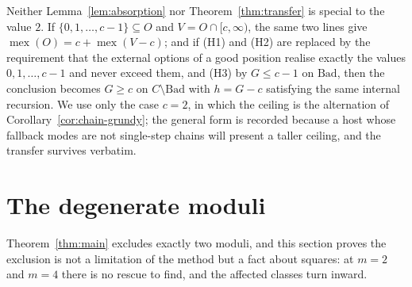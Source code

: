 \begin{remark}\label{rem:taller-ceiling}
Neither Lemma~\ref{lem:absorption} nor Theorem~\ref{thm:transfer} is
special to the value $2$. If $\{0, 1, \dots, c-1\} \subseteq O$ and
$V = O \cap [c, \infty)$, the same two lines give
$\operatorname{mex}(O) = c + \operatorname{mex}(V - c)$; and if (H1) and
(H2) are replaced by the requirement that the external options of a good
position realise exactly the values $0, 1, \dots, c-1$ and never exceed
them, and (H3) by $G \le c-1$ on $\mathrm{Bad}$, then the conclusion
becomes $G \ge c$ on $C \setminus \mathrm{Bad}$ with $h = G - c$
satisfying the same internal recursion. We use only the case $c = 2$, in
which the ceiling is the alternation of
Corollary~\ref{cor:chain-grundy}; the general form is recorded because a
host whose fallback modes are not single-step chains will present a
taller ceiling, and the transfer survives verbatim.
\end{remark}

\section{The degenerate moduli}\label{sec:disease}

Theorem~\ref{thm:main} excludes exactly two moduli, and this section
proves the exclusion is not a limitation of the method but a fact about
squares: at $m = 2$ and $m = 4$ there is no rescue to find, and the
affected classes turn inward.

